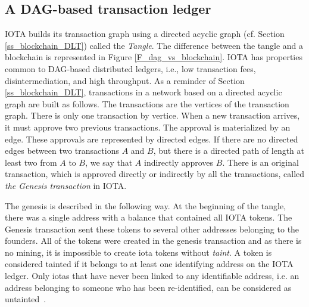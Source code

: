 \subsection{A DAG-based transaction ledger}
IOTA builds its transaction graph using a directed acyclic graph (cf. Section \ref{ss_blockchain_DLT}) called the \emph{Tangle}. The difference between the tangle and a blockchain is represented in Figure \ref{F_dag_vs_blockchain}.
IOTA has properties common to DAG-based distributed ledgers, i.e., low transaction fees, disintermediation, and high throughput.
As a reminder of Section \ref{ss_blockchain_DLT}, transactions in a network based on a directed acyclic graph are built as follows. 
The transactions are the vertices of the transaction graph. There is only one transaction by vertice.
When a new transaction arrives, it must approve two previous transactions. The approval is materialized by an edge. These
approvals are represented by directed edges. If there are no
directed edges between two transactions $A$ and $B$, but there is a directed
path of length at least two from $A$ to $B$, we say that $A$ indirectly approves $B$.
There is an original transaction, which is approved directly or indirectly by all the transactions, called \emph{the Genesis transaction} 
in IOTA. 

The genesis is described in the following way. At
the beginning of the tangle, there was a single address with a balance that contained all
IOTA tokens. The Genesis transaction sent these tokens to several other addresses belonging to the founders. All of the tokens were created in the genesis transaction and as there is no mining, it is impossible 
to create iota tokens without \emph{taint}.
A token is considered tainted if it belongs to at least one identifying address on the IOTA ledger. 
Only iotas that have never been linked to any identifiable address, i.e. an address belonging to someone who has been re-identified, can be considered as untainted~\cite{Tennant2017}.

